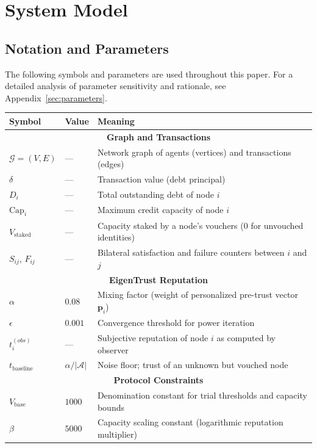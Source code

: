 \documentclass[11pt]{article}
\begin{document}
\section{System Model}
\label{sec:model}

\subsection{Notation and Parameters}

The following symbols and parameters are used throughout this paper. For a detailed analysis of parameter sensitivity and rationale, see Appendix~\ref{sec:parameters}.

\begin{center}
\begin{tabular}{|l|l|p{7cm}|}
\hline
\textbf{Symbol} & \textbf{Value} & \textbf{Meaning} \\
\hline
\hline
\multicolumn{3}{|c|}{\textbf{Graph and Transactions}} \\
\hline
$\mathcal{G} = (V, E)$ & --- & Network graph of agents (vertices) and transactions (edges) \\
$\delta$ & --- & Transaction value (debt principal) \\
$D_i$ & --- & Total outstanding debt of node $i$ \\
$\text{Cap}_i$ & --- & Maximum credit capacity of node $i$ \\
$V_{\text{staked}}$ & --- & Capacity staked by a node's vouchers (0 for unvouched identities) \\
$S_{ij}$, $F_{ij}$ & --- & Bilateral satisfaction and failure counters between $i$ and $j$ \\
\hline
\multicolumn{3}{|c|}{\textbf{EigenTrust Reputation}} \\
\hline
$\alpha$ & $0.08$ & Mixing factor (weight of personalized pre-trust vector $\mathbf{p}_i$) \\
$\epsilon$ & $0.001$ & Convergence threshold for power iteration \\
$t_i^{(obs)}$ & --- & Subjective reputation of node $i$ as computed by observer \\
$t_{\text{baseline}}$ & $\alpha / |\mathcal{A}|$ & Noise floor; trust of an unknown but vouched node \\
\hline
\multicolumn{3}{|c|}{\textbf{Protocol Constraints}} \\
\hline
$V_{\text{base}}$ & $1000$ & Denomination constant for trial thresholds and capacity bounds \\
$\beta$ & $5000$ & Capacity scaling constant (logarithmic reputation multiplier) \\

\end{tabular}
\end{center}
\end{document}
